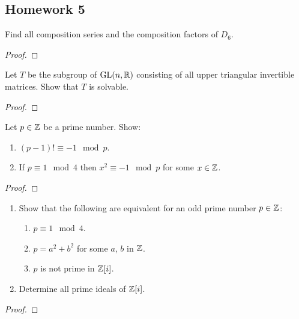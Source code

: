 \subsection{Homework 5}
\begin{problem}
Find all composition series and the composition factors of $D_6$.
\end{problem}
\begin{proof}
\end{proof}

\begin{problem}
Let $T$ be the subgroup of $\mathrm{GL}(n,\mathbb{R})$ consisting of all upper triangular
invertible matrices. Show that $T$ is solvable.
\end{problem}
\begin{proof}
\end{proof}

\begin{problem}
Let $p\in\mathbb{Z}$ be a prime number. Show:
\begin{enumerate}[label=(\alph*)]
\item $(p-1)!\equiv -1\mod{p}$.
\item If $p\equiv 1\mod{4}$ then $x^2\equiv -1\mod{p}$ for some
  $x\in\mathbb{Z}$.
\end{enumerate}
\end{problem}
\begin{proof}
\end{proof}

\begin{problem}
\begin{enumerate}[label=(\alph*)]
\item Show that the following are equivalent for an odd prime number
  $p\in\mathbb{Z}$:
  \begin{enumerate}[label=(\roman*)]
  \item $p\equiv 1\mod 4$.
  \item $p=a^2+b^2$ for some $a$, $b$ in $\mathbb{Z}$.
  \item $p$ is not prime in $\mathbb{Z}[i]$.
  \end{enumerate}
\item Determine all prime ideals of $\mathbb{Z}[i]$.
\end{enumerate}
\end{problem}
\begin{proof}
\end{proof}

